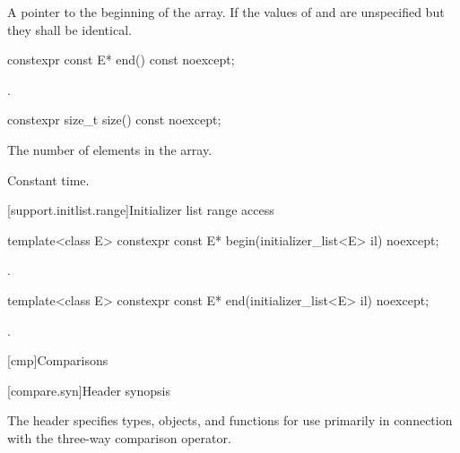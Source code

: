\begin{itemdescr}
\pnum
\returns A pointer to the beginning of the array. If  the
values of  and  are unspecified but they shall be
identical.
\end{itemdescr}

%
\begin{itemdecl}
constexpr const E* end() const noexcept;
\end{itemdecl}

\begin{itemdescr}
\pnum
\returns {}.
\end{itemdescr}

%
\begin{itemdecl}
constexpr size_t size() const noexcept;
\end{itemdecl}

\begin{itemdescr}
\pnum
\returns The number of elements in the array.

\pnum
\complexity Constant time.
\end{itemdescr}

[support.initlist.range]{Initializer list range access}

%
\begin{itemdecl}
template<class E> constexpr const E* begin(initializer_list<E> il) noexcept;
\end{itemdecl}

\begin{itemdescr}
\pnum
\returns {}.
\end{itemdescr}

%
\begin{itemdecl}
template<class E> constexpr const E* end(initializer_list<E> il) noexcept;
\end{itemdecl}

\begin{itemdescr}
\pnum
\returns {}.
\end{itemdescr}

[cmp]{Comparisons}

[compare.syn]{Header  synopsis}

\pnum
The header  specifies types, objects, and functions
for use primarily in connection with
the three-way comparison operator.

